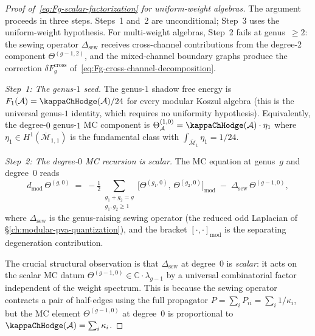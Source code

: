 \begin{proof}[Proof of~\eqref{eq:Fg-scalar-factorization}
for uniform-weight algebras]
The argument proceeds in three steps. Steps~1 and~2 are
unconditional; Step~3 uses the uniform-weight hypothesis.
For multi-weight algebras,
Step~2 fails at genus~$\geq 2$: the sewing operator
$\Delta_{\mathrm{sew}}$ receives cross-channel contributions
from the degree-$2$ component $\Theta^{(g-1,2)}$,
and the mixed-channel boundary graphs produce the correction
$\delta F_g^{\mathrm{cross}}$ of~\eqref{eq:Fg-cross-channel-decomposition}.

\emph{Step~1: The genus-$1$ seed.} The genus-$1$ shadow free energy
is $F_1(\cA) = \kappaChHodge(\cA)/24$ for every modular Koszul
algebra (this is the universal genus-$1$ identity, which requires no
uniformity hypothesis). Equivalently, the degree-$0$ genus-$1$ MC
component is $\Theta^{(1,0)}_\cA = \kappaChHodge(\cA) \cdot \eta_1$ where
$\eta_1 \in H^1(\overline{\mathcal{M}}_{1,1})$ is the fundamental
class with $\int_{\overline{\mathcal{M}}_1} \eta_1 = 1/24$.

\emph{Step~2: The degree-$0$ MC recursion is scalar.} The MC
equation at genus~$g$ and degree~$0$ reads
\begin{equation}\label{eq:MC-genus-g-degree-0}
d_{\mathrm{mod}}\,\Theta^{(g,0)}
\;=\; -\tfrac{1}{2}
\sum_{\substack{g_1 + g_2 = g\\g_1, g_2 \geq 1}}
\bigl[\Theta^{(g_1,0)},\, \Theta^{(g_2,0)}\bigr]_{\mathrm{mod}}
\;-\; \Delta_{\mathrm{sew}}\,\Theta^{(g-1,0)},
\end{equation}
where $\Delta_{\mathrm{sew}}$ is the genus-raising sewing
operator (the reduced odd Laplacian of
\S\ref{ch:modular-pva-quantization}), and the bracket
$[\cdot,\cdot]_{\mathrm{mod}}$ is the separating degeneration
contribution.

The crucial structural observation is that
$\Delta_{\mathrm{sew}}$ at degree~$0$ is \emph{scalar}:
it acts on the scalar MC datum $\Theta^{(g-1,0)} \in
\mathbb{C} \cdot \lambda_{g-1}$ by a universal combinatorial
factor independent of the weight spectrum. This is because the
sewing operator contracts a pair of half-edges using the full
propagator $P = \sum_i P_{ii} = \sum_i 1/\kappa_i$, but the MC
element $\Theta^{(g-1,0)}$ at degree~$0$ is proportional to
$\kappaChHodge(\cA) = \sum_i \kappa_i$.


\end{proof}
